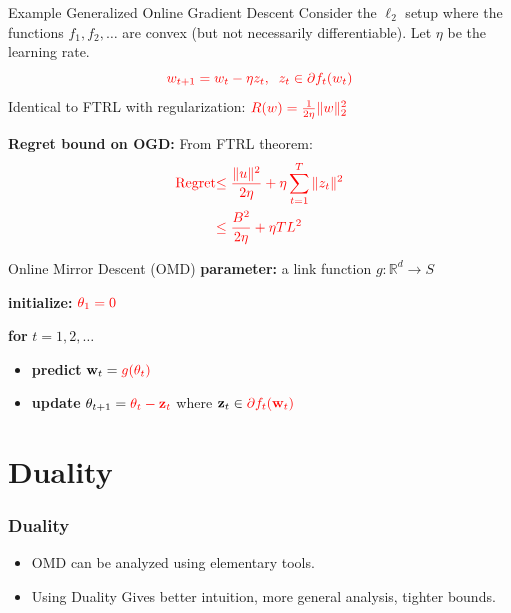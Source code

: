 \documentclass[handout]{beamer}
\begin{document}
\begin{frame}{Example Generalized Online Gradient Descent}
  Consider the $\ell_2$ setup where the functions $f_1,f_2,\ldots$ are convex (but not necessarily differentiable).
  Let $\eta$ be the learning rate.
\[
  \textcolor{red}{w_{t+1} = w_t - \eta z_t,\;\;
    z_t \in \partial f_t(w_t)}
\]
Identical to FTRL with regularization: $\textcolor{red}{R(w) = \frac{1}{2\eta}\|w\|_2^2}$

{\bf Regret bound on OGD:} From FTRL theorem:
\begin{align*}
\textcolor{red}{\text{Regret}} &\textcolor{red}{\leq \frac{\|u\|^2}{2\eta} + \eta \sum_{t=1}^T \|z_t\|^2} \\
&\textcolor{red}{\leq \frac{B^2}{2\eta} + \eta T L^2}
\end{align*}
\end{frame}


\begin{frame}{Online Mirror Descent (OMD)}
\textbf{parameter:} a link function \( g : \mathbb{R}^d \to S \)

\textbf{initialize:} \( \textcolor{mathcolor}{\theta_1 = 0} \)

\textbf{for} \( t = 1,2,\dots \)
\begin{itemize}
    \item \textbf{predict} \( \mathbf{w}_t = \textcolor{mathcolor}{ g(\theta_t) } \)
    \item \textbf{update} \( \theta_{t+1} = \textcolor{mathcolor}{ \theta_t - \mathbf{z}_t } \) where \( \mathbf{z}_t \in \textcolor{mathcolor}{ \partial f_t(\mathbf{w}_t) } \)
\end{itemize}
\end{frame}




\section{Duality}

\begin{frame}
  \frametitle{Duality}
  \begin{itemize}
  \item OMD can be analyzed using elementary tools.
    \item Using Duality Gives better intuition, more general analysis, tighter bounds.
  \end{itemize}
\end{frame}
\end{document}
